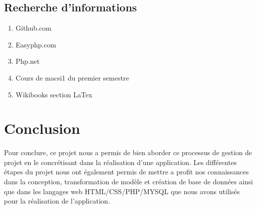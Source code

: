 \documentclass[a4paper, 12pt]{article}
\begin{document}
\subsection{Recherche d’informations}
\begin{enumerate}
	\item Github.com
	\item Easyphp.com
	\item Php.net
	\item Cours de macsi1 du premier semestre
	\item Wikibooks section LaTex
\end{enumerate}

\newpage

\section{Conclusion}
\paragraph{}Pour conclure, ce projet nous a permis de bien aborder ce processus de gestion de projet en le concrétisant dans la réalisation d'une application. Les différentes étapes du projet nous ont également permis de mettre a profit nos connaissances dans la conception, transformation de modèle et création de base de données ainsi que dans les langages web HTML/CSS/PHP/MYSQL que nous avons utilisés pour la réalisation de l'application.
\end{document}
